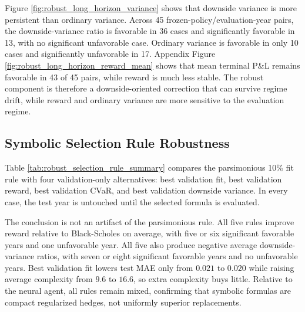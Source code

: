\documentclass[a4paper,12pt]{article}
\numberwithin{equation}{section}
\begin{document}
Figure \ref{fig:robust_long_horizon_variance} shows that downside variance is more persistent than ordinary variance. Across 45 frozen-policy/evaluation-year pairs, the downside-variance ratio is favorable in 36 cases and significantly favorable in 13, with no significant unfavorable case. Ordinary variance is favorable in only 10 cases and significantly unfavorable in 17. Appendix Figure \ref{fig:robust_long_horizon_reward_mean} shows that mean terminal P\&L remains favorable in 43 of 45 pairs, while reward is much less stable. The robust component is therefore a downside-oriented correction that can survive regime drift, while reward and ordinary variance are more sensitive to the evaluation regime.

\subsection{Symbolic Selection Rule Robustness}
\label{sec:robust_symbolic_selection}

Table \ref{tab:robust_selection_rule_summary} compares the parsimonious 10\% fit rule with four validation-only alternatives: best validation fit, best validation reward, best validation CVaR, and best validation downside variance. In every case, the test year is untouched until the selected formula is evaluated.

\begin{table}[H]
    \centering
    \caption{Robustness of symbolic policy performance to the validation selection rule. ``Comp.'' is average expression-tree complexity and MAE is average test mean absolute delta error against the traded agent. Trading columns report averages across test years; parentheses give significant favorable/unfavorable years. Reward entries are left-minus-right differences. DownVar entries are log left-to-right downside-variance ratios, so negative values are favorable.}
    \label{tab:robust_selection_rule_summary}
    \small
    
\end{table}

The conclusion is not an artifact of the parsimonious rule. All five rules improve reward relative to Black-Scholes on average, with five or six significant favorable years and one unfavorable year. All five also produce negative average downside-variance ratios, with seven or eight significant favorable years and no unfavorable years. Best validation fit lowers test MAE only from $0.021$ to $0.020$ while raising average complexity from $9.6$ to $16.6$, so extra complexity buys little. Relative to the neural agent, all rules remain mixed, confirming that symbolic formulas are compact regularized hedges, not uniformly superior replacements.
\end{document}
